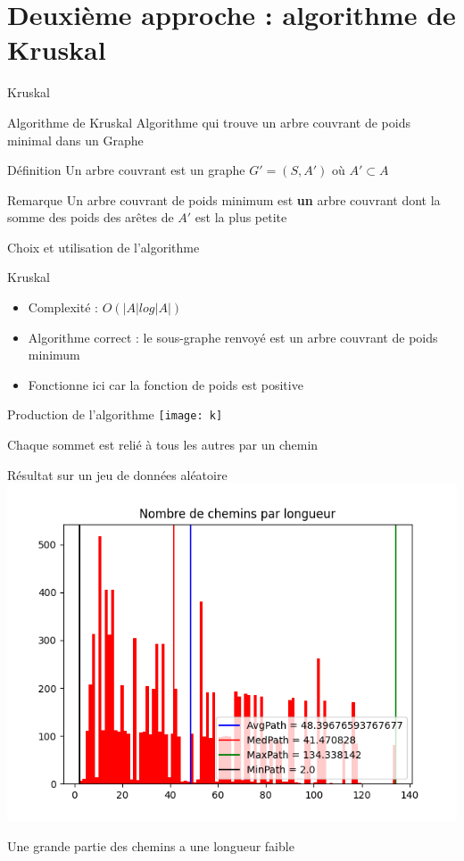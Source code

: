 \documentclass[aspectratio=43,11pt]{beamer}
\begin{document}
\section{Deuxième approche : algorithme de Kruskal}
\begin{frame}{Kruskal}
    \begin{block}{Algorithme de Kruskal}
        Algorithme qui trouve un arbre couvrant de poids minimal dans un Graphe
    \end{block}
    \begin{block}{Définition}
        Un arbre couvrant est un graphe $G'=(S, A')$ où $A' \subset A$
    \end{block}
    \begin{exampleblock}{Remarque}
        Un arbre couvrant de poids minimum est \textbf{un} arbre couvrant dont la somme des poids des arêtes de $A'$ est la plus petite
    \end{exampleblock}
\end{frame}
\begin{frame}{Choix et utilisation de l'algorithme}
\end{frame}
\begin{frame}{Kruskal}
    \begin{itemize}
        \item Complexité : $O(|A| log |A|)$
        \item Algorithme correct : le sous-graphe renvoyé est un arbre couvrant de poids minimum
        \item Fonctionne ici car la fonction de poids est positive
    \end{itemize}
\end{frame}
\begin{frame}{Production de l'algorithme}
    \centering
        \texttt{[image: k]}

    Chaque sommet est relié à tous les autres par un chemin
\end{frame}
\begin{frame}{Résultat sur un jeu de données aléatoire}
    \centering
        \includegraphics[height=0.8\textheight]{k_r}

    Une grande partie des chemins a une longueur faible
\end{frame}
\end{document}
